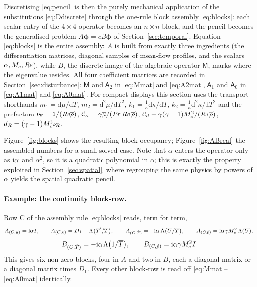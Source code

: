 \documentclass[11pt]{article}
\begin{document}
Discretising \eqref{eq:pencil} is then the purely mechanical application of the substitutions
\eqref{eq:Ddiscrete} through the one-rule block assembly \eqref{eq:blocks}: each scalar entry of
the $4\times4$ operator becomes an $n\times n$ block, and the pencil becomes the generalised
problem $A\boldsymbol\phi=cB\boldsymbol\phi$ of Section~\ref{sec:temporal}. Equation
\eqref{eq:blocks} is the entire assembly: $A$ is built from exactly three ingredients (the
differentiation matrices, diagonal samples of mean-flow profiles, and the scalars
$\alpha,M_e,\mathit{Re}$), while $B$, the discrete image of the algebraic operator $\mathsf M$, marks
where the eigenvalue resides. All four coefficient matrices are recorded in
Section~\ref{sec:disturbance}: $\mathsf M$ and $\mathsf A_2$ in \eqref{eq:Mmat} and
\eqref{eq:A2mat}, $\mathsf A_1$ and $\mathsf A_0$ in \eqref{eq:A1mat} and \eqref{eq:A0mat}. For
compact displays this section uses the transport shorthands $m_1=\mathrm d\mu/\mathrm dT$,
$m_2=\mathrm d^2\mu/\mathrm dT^2$, $k_1=\tfrac1{\bar\kappa}\mathrm d\kappa/\mathrm dT$,
$k_2=\tfrac1{\bar\kappa}\mathrm d^2\kappa/\mathrm dT^2$ and the prefactors
$\nu_{\!R}=1/(\mathit{Re}\overline{\rho})$, $\mathcal C_\kappa=\gamma\overline{\mu}/(\mathit{Pr}\,\mathit{Re}\,\overline{\rho})$,
$\mathcal C_d=\gamma(\gamma-1)M_e^2/(\mathit{Re}\,\overline{\rho})$, $d_R=(\gamma-1)M_e^2\nu_{\!R}$.

Figure~\ref{fig:blocks} shows the resulting block occupancy; Figure~\ref{fig:ABreal} the
assembled numbers for a small solved case. Note that $\alpha$ enters the operator only as
$\mathrm{i}\alpha$ and $\alpha^2$, so it is a quadratic polynomial in $\alpha$; this is exactly the
property exploited in Section~\ref{sec:spatial}, where regrouping the same physics by powers of
$\alpha$ yields the spatial quadratic pencil.

\paragraph{Example: the continuity block-row.} Row C of the assembly rule \eqref{eq:blocks} reads,
term for term,
\begin{equation*}
  A_{(C,\hat{u})}=\mathrm{i}\alpha I,\qquad
  A_{(C,\hat{v})}=D_1-\Lambda\big(\overline{T}'/\overline{T}\big),\qquad
  A_{(C,\hat{T})}=-\mathrm{i}\alpha\,\Lambda\big(\overline{U}/\overline{T}\big),\qquad
  A_{(C,\hat{p})}=\mathrm{i}\alpha\gamma M_e^2\,\Lambda(\overline{U}),
\end{equation*}
\begin{equation*}
  B_{(C,\hat{T})}=-\mathrm{i}\alpha\,\Lambda\big(1/\overline{T}\big),\qquad
  B_{(C,\hat{p})}=\mathrm{i}\alpha\gamma M_e^2 I
\end{equation*}
This gives six non-zero blocks, four in $A$ and two in $B$, each a diagonal matrix or a diagonal
matrix times $D_1$. Every other block-row is read off \eqref{eq:Mmat}--\eqref{eq:A0mat} identically.
\end{document}
